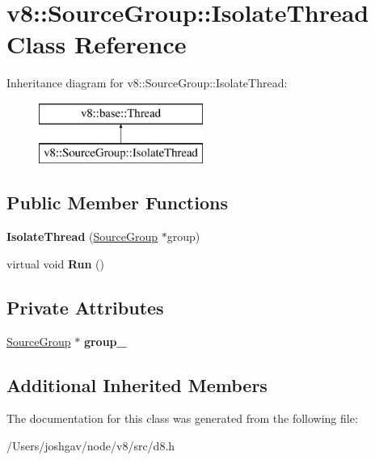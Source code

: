 \hypertarget{classv8_1_1_source_group_1_1_isolate_thread}{}\section{v8\+:\+:Source\+Group\+:\+:Isolate\+Thread Class Reference}
\label{classv8_1_1_source_group_1_1_isolate_thread}
Inheritance diagram for v8\+:\+:Source\+Group\+:\+:Isolate\+Thread\+:\begin{figure}[H]
\begin{center}
\leavevmode
\includegraphics[height=2.000000cm]{classv8_1_1_source_group_1_1_isolate_thread}
\end{center}
\end{figure}
\subsection*{Public Member Functions}
\begin{DoxyCompactItemize}
\item 
{\bfseries Isolate\+Thread} (\hyperlink{classv8_1_1_source_group}{Source\+Group} $\ast$group)\hypertarget{classv8_1_1_source_group_1_1_isolate_thread_a0c3a0c21d6ca05b5ee9e40c259c87562}{}\label{classv8_1_1_source_group_1_1_isolate_thread_a0c3a0c21d6ca05b5ee9e40c259c87562}

\item 
virtual void {\bfseries Run} ()\hypertarget{classv8_1_1_source_group_1_1_isolate_thread_a2e013238654e807486cc55bd4d56ebdc}{}\label{classv8_1_1_source_group_1_1_isolate_thread_a2e013238654e807486cc55bd4d56ebdc}

\end{DoxyCompactItemize}
\subsection*{Private Attributes}
\begin{DoxyCompactItemize}
\item 
\hyperlink{classv8_1_1_source_group}{Source\+Group} $\ast$ {\bfseries group\+\_\+}\hypertarget{classv8_1_1_source_group_1_1_isolate_thread_a5c35459874255f3beb50b0c9b875c869}{}\label{classv8_1_1_source_group_1_1_isolate_thread_a5c35459874255f3beb50b0c9b875c869}

\end{DoxyCompactItemize}
\subsection*{Additional Inherited Members}


The documentation for this class was generated from the following file\+:\begin{DoxyCompactItemize}
\item 
/\+Users/joshgav/node/v8/src/d8.\+h\end{DoxyCompactItemize}
